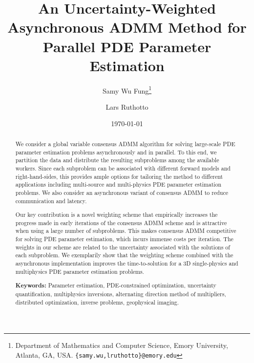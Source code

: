 \documentclass[11pt]{article}          %
\date{\today}
\newcommand*\samethanks[1][\value{footnote}]{\footnotemark[#1]}
\begin{document}
\title{An Uncertainty-Weighted Asynchronous ADMM Method for Parallel PDE Parameter Estimation} %



\author{%
Samy Wu Fung\thanks{Department of Mathematics and Computer Science, Emory University,  Atlanta, GA, USA. \texttt{\{samy.wu,lruthotto\}@emory.edu}} \and Lars Ruthotto\samethanks[1]}
\maketitle
\begin{abstract}
We consider a global variable consensus ADMM algorithm for solving large-scale PDE parameter estimation problems asynchronously and in parallel. To this end, we partition the data and distribute the resulting subproblems among the available workers. Since each subproblem can be associated with different forward models and right-hand-sides, this provides ample options for tailoring the method to different applications including multi-source and multi-physics PDE parameter estimation problems. We also consider an asynchronous variant of consensus ADMM to reduce communication and latency.

Our key contribution is a novel weighting scheme that empirically increases the progress made in early iterations of the consensus ADMM scheme and is attractive when using a large number of subproblems. This makes consensus ADMM competitive for solving PDE parameter estimation, which incurs immense costs per iteration. The weights in our scheme are related to the uncertainty associated with the solutions of each subproblem. We exemplarily show that the weighting scheme combined with the asynchronous implementation improves the time-to-solution for a 3D single-physics and multiphysics PDE parameter estimation problems.

\vspace{3mm}
\textbf{Keywords:} Parameter estimation, PDE-constrained optimization, uncertainty quantification, multiphysics inversions, alternating direction method of multipliers, distributed optimization, inverse problems, geophysical imaging.
\end{abstract}
\end{document}
